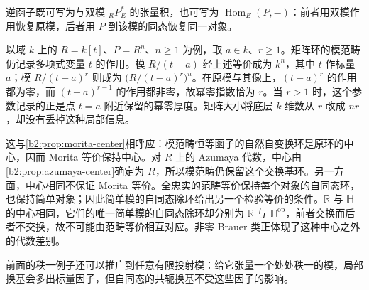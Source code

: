 逆函子既可写为与双模 \({}_RP^*_E\) 的张量积，也可写为 \(\operatorname{Hom}_E(P,-)\)：前者用双模作用恢复原模，后者用 \(P\) 到该模的同态恢复同一对象。

\ProseParagraphBreak
以域 \(k\) 上的 \(R=k[t]\)、\(P=R^n\)、\(n\ge1\) 为例，取 \(a\in k\)、\(r\ge1\)。矩阵环的模范畴仍记录多项式变量 \(t\) 的作用。模 \(R/(t-a)\) 经上述等价成为 \(k^n\)，其中 \(t\) 作标量 \(a\)；模 \(R/(t-a)^r\) 则成为 \(\bigl(R/(t-a)^r\bigr)^n\)。在原模与其像上，\((t-a)^r\) 的作用都为零，而 \((t-a)^{r-1}\) 的作用都非零，故幂零指数恰为 \(r\)。当 \(r>1\) 时，这个参数记录的正是点 \(t=a\) 附近保留的幂零厚度。矩阵大小将底层 \(k\) 维数从 \(r\) 改成 \(nr\)，却没有丢掉这种局部信息。

\ProseParagraphBreak
这与\cref{b2:prop:morita-center}相呼应：模范畴恒等函子的自然自变换环是原环的中心，因而 Morita 等价保持中心。对 \(R\) 上的 Azumaya 代数，中心由\cref{b2:prop:azumaya-center}确定为 \(R\)，所以模范畴仍保留这个交换基环。另一方面，中心相同不保证 Morita 等价。全忠实的范畴等价保持每个对象的自同态环，也保持简单对象；因此简单模的自同态除环给出另一个检验等价的条件。\(\mathbb R\) 与 \(\mathbb H\) 的中心相同，它们的唯一简单模的自同态除环却分别为 \(\mathbb R\) 与 \(\mathbb H^{\mathrm{op}}\)，前者交换而后者不交换，故不可能由范畴等价相互对应。非零 Brauer 类正体现了这种中心之外的代数差别。

\ProseParagraphBreak
前面的秩一例子还可以推广到任意有限投射模：给它张量一个处处秩一的模，局部换基会多出标量因子，但自同态的共轭换基不受这些因子的影响。

